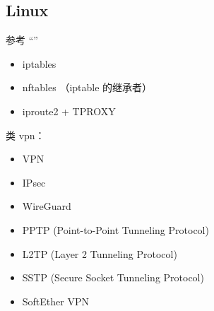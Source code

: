 \subsection{Linux}
参考 “”
\begin{itemize}
\item iptables
\item nftables （iptable 的继承者）
\item iproute2 + TPROXY
\end{itemize}

类 vpn：
\begin{itemize}
\item VPN
\item IPsec
\item WireGuard
\item PPTP (Point-to-Point Tunneling Protocol)
\item L2TP (Layer 2 Tunneling Protocol)
\item SSTP (Secure Socket Tunneling Protocol)
\item SoftEther VPN
\end{itemize}
